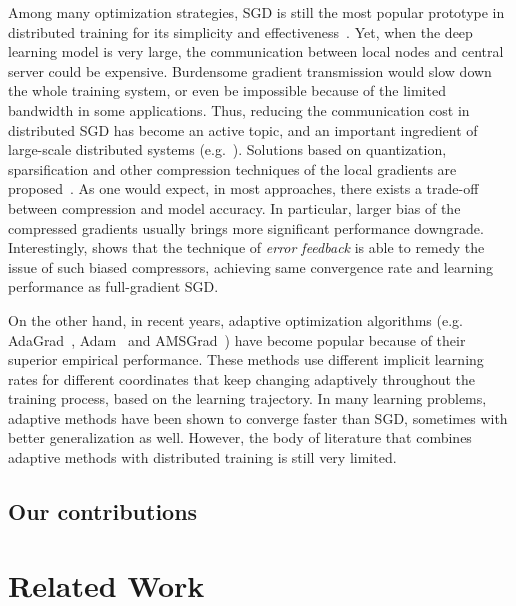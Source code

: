 \documentclass[11pt]{article}
\begin{document}
Among many optimization strategies, SGD is still the most popular prototype in distributed training for its simplicity and effectiveness~\cite{Proc:Agrawal_NIPS19,Proc:Wu_ICML18,mikami2018massively}. Yet, when the deep learning model is very large, the communication between local nodes and central server could be expensive. Burdensome gradient transmission would slow down the whole training system, or even be impossible because of the limited bandwidth in some applications. Thus, reducing the communication cost in distributed SGD has become an active topic, and an important ingredient of large-scale distributed systems (e.g.~\cite{Proc:Seide14}). Solutions based on quantization, sparsification and other compression techniques of the local gradients are proposed~\cite{alistarh2017qsgd,wen2017terngrad,jiang2018linear,wangni2017gradient,haddadpour2019trading,chen2010approximate,jegou2010product,stich2018sparsified,aji2017sparse,bernstein2018signsgd,de2017understanding,yang2019swalp,Proc:Ivkin_NIPS19}. As one would expect, in most approaches, there exists a trade-off between compression and model accuracy. In particular, larger bias of the compressed gradients usually brings more significant performance downgrade. Interestingly, \cite{karimireddy2019error} shows that the technique of \textit{error feedback} is able to remedy the issue of such biased compressors, achieving same convergence rate and learning performance as full-gradient SGD.


On the other hand, in recent years, adaptive optimization algorithms (e.g. AdaGrad~\cite{Duchi10-adagrad}, Adam~\cite{kingma2014adam} and AMSGrad~\cite{reddi2019convergence}) have become popular because of their superior empirical performance. These methods use different implicit learning rates for different coordinates that keep changing adaptively throughout the training process, based on the learning trajectory. In many learning problems, adaptive methods have been shown to converge faster than SGD, sometimes with better generalization as well. However, the body of literature that combines adaptive methods with distributed training is still very limited.

\subsection{Our contributions}


\section{Related Work}\label{sec:related}
\end{document}

